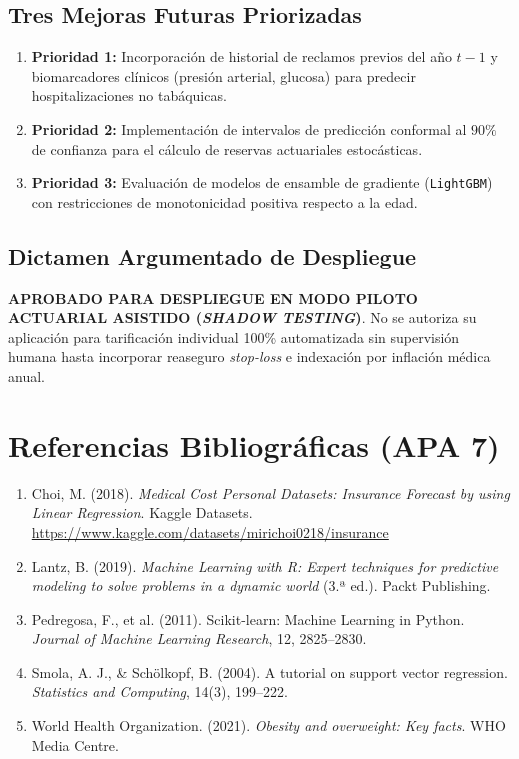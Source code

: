 \documentclass[11pt,a4paper]{article}
\begin{document}
\subsection{Tres Mejoras Futuras Priorizadas}
\begin{enumerate}[leftmargin=*]
    \item \textbf{Prioridad 1:} Incorporación de historial de reclamos previos del año $t-1$ y biomarcadores clínicos (presión arterial, glucosa) para predecir hospitalizaciones no tabáquicas.
    \item \textbf{Prioridad 2:} Implementación de intervalos de predicción conformal al $90\%$ de confianza para el cálculo de reservas actuariales estocásticas.
    \item \textbf{Prioridad 3:} Evaluación de modelos de ensamble de gradiente (\texttt{LightGBM}) con restricciones de monotonicidad positiva respecto a la edad.
\end{enumerate}

\subsection{Dictamen Argumentado de Despliegue}
\textbf{APROBADO PARA DESPLIEGUE EN MODO PILOTO ACTUARIAL ASISTIDO (\textit{SHADOW TESTING})}. No se autoriza su aplicación para tarificación individual 100\% automatizada sin supervisión humana hasta incorporar reaseguro \textit{stop-loss} e indexación por inflación médica anual.

\section*{Referencias Bibliográficas (APA 7)}
\begin{enumerate}[leftmargin=*]
    \item Choi, M. (2018). \textit{Medical Cost Personal Datasets: Insurance Forecast by using Linear Regression}. Kaggle Datasets. \url{https://www.kaggle.com/datasets/mirichoi0218/insurance}
    \item Lantz, B. (2019). \textit{Machine Learning with R: Expert techniques for predictive modeling to solve problems in a dynamic world} (3.ª ed.). Packt Publishing.
    \item Pedregosa, F., et al. (2011). Scikit-learn: Machine Learning in Python. \textit{Journal of Machine Learning Research}, 12, 2825--2830.
    \item Smola, A. J., \& Schölkopf, B. (2004). A tutorial on support vector regression. \textit{Statistics and Computing}, 14(3), 199--222.
    \item World Health Organization. (2021). \textit{Obesity and overweight: Key facts}. WHO Media Centre.
\end{enumerate}
\end{document}
